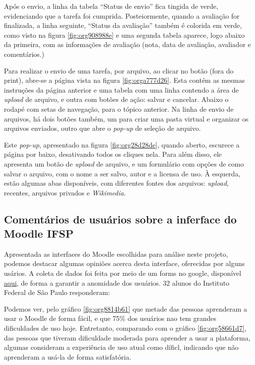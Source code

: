 \documentclass[11pt]{article}
\begin{document}
Após o envio, a linha da tabela ``Status de envio'' fica tingida de
verde, evidenciando que a tarefa foi cumprida. Posteiormente, quando a
avaliação for finalizada, a linha seguinte, ``Status da avaliação''
também é colorida em verde, como visto na figura \ref{fig:org908988e} e uma
segunda tabela aparece, logo abaixo da primeira, com as informações de
avaliação (nota, data de avaliação, avaliador e comentários.)

Para realizar o envio de uma tarefa, por arquivo, ao clicar no botão
(fora do print), abre-se a página vista na figura \ref{fig:orga777d26}. Esta
contém as mesmas instruções da página anterior e uma tabela com uma
linha contendo a área de \emph{upload} de arquivo, e outra com botões de
ação: salvar e cancelar. Abaixo o rodapé com setas de navegação, para
o tópico anterior. Na linha de envio de arquivos, há dois botões
também, um para criar uma pasta virtual e organizar os arquivos
enviados, outro que abre o \emph{pop-up} de seleção de arquivo.

Este \emph{pop-up}, apresentado na figura \ref{fig:org28d28de}, quando aberto,
escurece a página por baixo, desativando todos os cliques nela.  Para
além disso, ele apresenta um botão de \emph{upload} de arquivo, e um
formulário com opções de como salvar o arquivo, com o nome a ser
salvo, autor e a licensa de uso. À esquerda, estão algumas abas
disponíveis, com diferentes fontes dos arquivos: \emph{upload}, recentes,
arquivos privados e \emph{Wikimedia}.


\subsection*{Comentários de usuários sobre a inferface do Moodle IFSP}
\label{sec:orgfd8fdac}
Apresentada as interfaces do Moodle escolhidas para análise neste
projeto, podemos destacar algumas opiniões acerca desta interface,
oferecidas por alguns usários. A coleta de dados foi feita por meio de
um forms no google, disponível \href{https://forms.gle/U3KtLT2xPk4pn2q5A}{aqui}, de forma a garantir a anomidade
dos usuários. 32 alunos do Instituto Federal de São Paulo responderam:

Podemos ver, pelo gráfico \ref{fig:org8814b61} que metade das pessoas
aprenderam a usar o Moodle de forma fácil, e que 75\% dos usuários nao
tem grandes dificuldades de uso hoje.  Entretanto, comparando com o
gráfico \ref{fig:org58661d7}, das pessoas que tiveram dificuldade moderada para
aprender a usar a plataforma, algumas consideram a experiência de uso
atual como díficl, indicando que não aprenderam a usá-la de forma
satisfatória.
\end{document}
